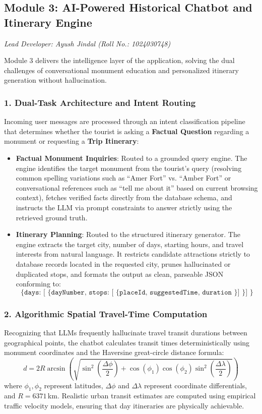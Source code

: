 \documentclass[12pt,a4paper,twoside,openright]{report}
\begin{document}
\subsection{Module 3: AI-Powered Historical Chatbot and Itinerary Engine}

\textit{Lead Developer: Ayush Jindal (Roll No.: 1024030748)}

Module 3 delivers the intelligence layer of the application, solving the dual challenges of conversational monument education and personalized itinerary generation without hallucination.

\subsubsection{1. Dual-Task Architecture and Intent Routing}
Incoming user messages are processed through an intent classification pipeline that determines whether the tourist is asking a \textbf{Factual Question} regarding a monument or requesting a \textbf{Trip Itinerary}:
\begin{itemize}[leftmargin=*]
    \item \textbf{Factual Monument Inquiries}: Routed to a grounded query engine. The engine identifies the target monument from the tourist's query (resolving common spelling variations such as ``Amer Fort'' vs. ``Amber Fort'' or conversational references such as ``tell me about it'' based on current browsing context), fetches verified facts directly from the database schema, and instructs the LLM via prompt constraints to answer strictly using the retrieved ground truth.
    \item \textbf{Itinerary Planning}: Routed to the structured itinerary generator. The engine extracts the target city, number of days, starting hours, and travel interests from natural language. It restricts candidate attractions strictly to database records located in the requested city, prunes hallucinated or duplicated stops, and formats the output as clean, parseable JSON conforming to:
    $$\texttt{\{ days: [ \{ dayNumber, stops: [ \{ placeId, suggestedTime, duration \} ] \} ] \}}$$
\end{itemize}

\subsubsection{2. Algorithmic Spatial Travel-Time Computation}
Recognizing that LLMs frequently hallucinate travel transit durations between geographical points, the chatbot calculates transit times deterministically using monument coordinates and the Haversine great-circle distance formula:
\begin{equation}
d = 2R \arcsin\left(\sqrt{\sin^2\left(\frac{\Delta \phi}{2}\right) + \cos(\phi_1)\cos(\phi_2)\sin^2\left(\frac{\Delta \lambda}{2}\right)}\right)
\end{equation}
where $\phi_1, \phi_2$ represent latitudes, $\Delta \phi$ and $\Delta \lambda$ represent coordinate differentials, and $R = 6371$\,km. Realistic urban transit estimates are computed using empirical traffic velocity models, ensuring that day itineraries are physically achievable.
\end{document}
